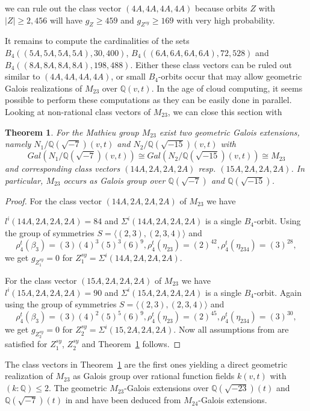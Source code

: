 \documentclass[12pt,a4paper]{article}
\newtheorem{theorem}{Theorem}[section]
\numberwithin{equation}{section}
\numberwithin{table}{section}
\begin{document}
we can rule out the class vector $(4A,4A,4A,4A)$ because orbits $Z$ with $ \vert Z \vert  \geq 2,456$
will have $g_Z \geq 459$ and $g_{Z^{sy}} \geq 169$ with very high probability.
\par
\noindent
It remains to compute the cardinalities of the sets
$B_4((5A,5A,5A,5A),30,400)$,
$B_4((6A,6A,6A,6A),72,528)$ and
$B_4((8A,8A,8A,8A),198,488)$.
Either these class vectors can be ruled out similar to $(4A,4A,4A,4A)$, or small $B_4$-orbits occur
that may allow geometric Galois realizations of $M_{23}$ over $\mathbb{Q}(v,t)$.
In the age of cloud computing, it seems possible to perform these computations as they can be
easily done in parallel.
Looking at non-rational class vectors of $M_{23}$, we can close this section with
\begin{theorem}
\label{M23AsGaloisGroupOverQSqrt}
For the Mathieu group $M_{23}$ exist two geometric Galois extensions, namely $N_1/\mathbb{Q}(\sqrt{-7})(v,t)$
and $N_2/\mathbb{Q}(\sqrt{-15})(v,t)$ with 
$$Gal(N_1/\mathbb{Q}(\sqrt{-7})(v,t)) \cong Gal(N_2/\mathbb{Q}(\sqrt{-15})(v,t)) \cong M_{23}$$
and corresponding class vectors $(14A,2A,2A,2A)$ resp. $(15A,2A,2A,2A)$.
In particular, $M_{23}$ occurs as Galois group over $\mathbb{Q}(\sqrt{-7})$ and $\mathbb{Q}(\sqrt{-15})$.
\end{theorem}
\begin{proof}
For the class vector $(14A,2A,2A,2A)$ of $M_{23}$ we have 
\par
\noindent
$l^i(14A,2A,2A,2A)=84$ and $\Sigma^i(14A,2A,2A,2A)$ is a single $B_4$-orbit. 
Using the group of symmetries $S = \langle (2,3), (2,3,4) \rangle$ and
$$\rho^t_4(\beta_3)=(3)(4)^3(5)^3(6)^9, \rho^t_4(\eta_{23})=(2)^{42}, \rho^t_4(\eta_{234})=(3)^{28},$$
we get $g_{Z_1^{sy}} = 0$ for $Z_1^{sy} = \Sigma^i(14A,2A,2A,2A)$.
\par
\noindent
For the class vector $(15A,2A,2A,2A)$ of $M_{23}$ we have $l^i(15A,2A,2A,2A)=90$ and $\Sigma^i(15A,2A,2A,2A)$
is a single $B_4$-orbit. 
Again using the group of symmetries $S = \langle (2,3), (2,3,4) \rangle$ and
$$\rho^t_4(\beta_3)=(3)(4)^2(5)^5(6)^9, \rho^t_4(\eta_{23})=(2)^{45}, \rho^t_4(\eta_{234})=(3)^{30},$$
we get $g_{Z_2^{sy}} = 0$ for $Z_2^{sy} = \Sigma^i(15,2A,2A,2A)$.
Now all assumptions from \cite[III, Theorem 7.10]{RefMM2018} are satisfied for $Z_1^{sy}$, $Z_2^{sy}$
and Theorem~\ref{M23AsGaloisGroupOverQSqrt} follows.
\end{proof}
%
\noindent
The class vectors in Theorem~\ref{M23AsGaloisGroupOverQSqrt} are the first ones yielding a direct geometric 
realization of $M_{23}$ as Galois group over rational function fields $k(v,t)$ with $(k:\mathbb{Q}) \leq 2$. 
The geometric $M_{23}$-Galois extensions over $\mathbb{Q}(\sqrt{-23})(t)$ and $\mathbb{Q}(\sqrt{-7})(t)$
in \cite{RefHS1985} and \cite{RefHae1987} have been deduced from $M_{24}$-Galois extensions.
\end{document}
